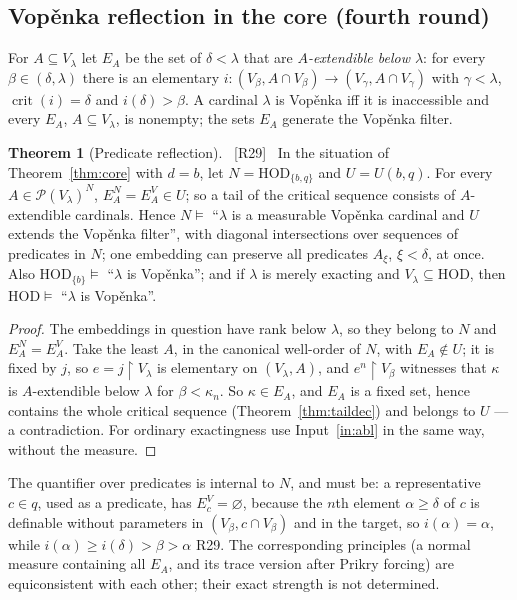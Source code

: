 \documentclass[11pt,letterpaper]{article}
\theoremstyle{definition}
\newtheorem{theorem}[definition]{Theorem}
\numberwithin{equation}{section}
\newcommand{\HOD}{\mathrm{HOD}}
\newcommand{\crit}{\operatorname{crit}}
\newcommand{\Pow}{\mathcal P}
\newcommand{\restr}{\mathbin{\upharpoonright}}
\newcommand{\src}[1]{\unskip\ {\normalfont\small\sffamily\color{Olive}[#1]}\ }
\newcommand{\R}[1]{\textsf{R#1}}
\begin{document}
\subsection{Vop\v enka reflection in the core (fourth round)}\label{sec:vopenka}

For $A\subseteq V_\lambda$ let $E_A$ be the set of $\delta<\lambda$ that are \emph{$A$-extendible below $\lambda$}: for every $\beta\in(\delta,\lambda)$ there is an elementary $i:(V_\beta,A\cap V_\beta)\to(V_\gamma,A\cap V_\gamma)$ with $\gamma<\lambda$, $\crit(i)=\delta$ and $i(\delta)>\beta$. A cardinal $\lambda$ is Vop\v enka iff it is inaccessible and every $E_A$, $A\subseteq V_\lambda$, is nonempty; the sets $E_A$ generate the Vop\v enka filter.

\begin{theorem}[Predicate reflection]\label{thm:vopenka}\src{R29}
In the situation of Theorem~\ref{thm:core} with $d=b$, let $N=\HOD_{\{b,q\}}$ and $U=U(b,q)$. For every $A\in\Pow(V_\lambda)^N$, $E^N_A=E^V_A\in U$; so a tail of the critical sequence consists of $A$-extendible cardinals. Hence $N\models$ ``$\lambda$ is a measurable Vop\v enka cardinal and $U$ extends the Vop\v enka filter'', with diagonal intersections over sequences of predicates in $N$; one embedding can preserve all predicates $A_\xi$, $\xi<\delta$, at once. Also $\HOD_{\{b\}}\models$ ``$\lambda$ is Vop\v enka''; and if $\lambda$ is merely exacting and $V_\lambda\subseteq\HOD$, then $\HOD\models$ ``$\lambda$ is Vop\v enka''.
\end{theorem}

\begin{proof}
The embeddings in question have rank below $\lambda$, so they belong to $N$ and $E^N_A=E^V_A$. Take the least $A$, in the canonical well-order of $N$, with $E_A\notin U$; it is fixed by $j$, so $e=j\restr V_\lambda$ is elementary on $(V_\lambda,A)$, and $e^n\restr V_\beta$ witnesses that $\kappa$ is $A$-extendible below $\lambda$ for $\beta<\kappa_n$. So $\kappa\in E_A$, and $E_A$ is a fixed set, hence contains the whole critical sequence (Theorem~\ref{thm:taildec}) and belongs to $U$ --- a contradiction. For ordinary exactingness use Input~\ref{in:abl} in the same way, without the measure.
\end{proof}

The quantifier over predicates is internal to $N$, and must be: a representative $c\in q$, used as a predicate, has $E^V_c=\varnothing$, because the $n$th element $\alpha\ge\delta$ of $c$ is definable without parameters in $(V_\beta,c\cap V_\beta)$ and in the target, so $i(\alpha)=\alpha$, while $i(\alpha)\ge i(\delta)>\beta>\alpha$ \R{29}. The corresponding principles (a normal measure containing all $E_A$, and its trace version after Prikry forcing) are equiconsistent with each other; their exact strength is not determined.
\end{document}
